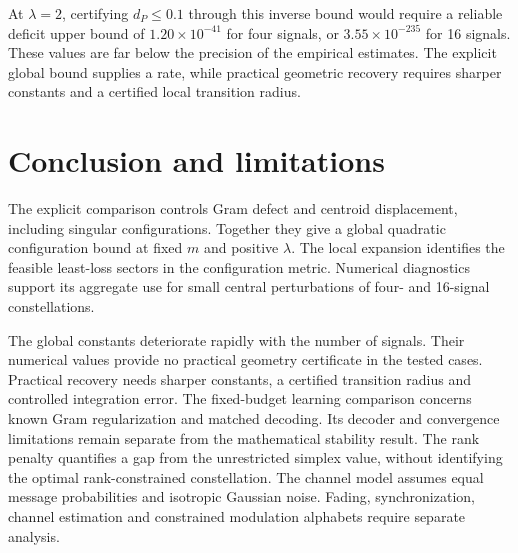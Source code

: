 \documentclass[11pt]{article}
\theoremstyle{remark}\newtheorem{remark}[theorem]{Remark}
\begin{document}
At $\lambda=2$, certifying $d_P\le0.1$ through this inverse bound would
require a reliable deficit upper bound of $1.20\times10^{-41}$ for four signals,
or $3.55\times10^{-235}$ for 16 signals.
These values are far below the precision of the empirical estimates.
The explicit global bound supplies a rate, while practical geometric recovery
requires sharper constants and a certified local transition radius.

\section{Conclusion and limitations}
The explicit comparison controls Gram defect and centroid displacement,
including singular configurations. Together they give a global quadratic
configuration bound at fixed $m$ and positive $\lambda$.
The local expansion identifies the feasible least-loss sectors in the
configuration metric. Numerical diagnostics support its aggregate use for
small central perturbations of four- and 16-signal constellations.

The global constants deteriorate rapidly with the number of signals.
Their numerical values provide no practical geometry certificate in the
tested cases. Practical recovery needs sharper constants, a certified
transition radius and controlled integration error.
The fixed-budget learning comparison concerns known Gram regularization
and matched decoding. Its decoder and convergence limitations remain separate
from the mathematical stability result.
The rank penalty quantifies a gap from the unrestricted simplex value,
without identifying the optimal rank-constrained constellation.
The channel model assumes equal message probabilities and isotropic Gaussian
noise. Fading, synchronization, channel estimation and constrained modulation
alphabets require separate analysis.
\end{document}

